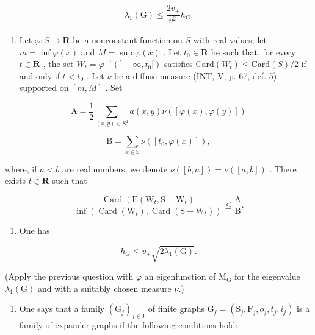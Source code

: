 \[
\lambda_ {1} (\mathrm{G}) \leqslant \frac {2 v _ {+}}{v _ {-} ^ {2}} h _ {\mathrm{G}}.
\]

\begin{enumerate}
\def\labelenumi{\alph{enumi})}
\setcounter{enumi}{2}
\tightlist
\item
  Let \(\varphi\colon S\to\mathbf{R}\) be a nonconstant function on \(S\) with real values; let \(m=\inf\varphi(x)\) and \(M=\sup\varphi(x)\) . Let \(t_{0}\in\mathbf{R}\) be such that, for every \(t\in\mathbf{R}\) , the set \(W_{t}=\overline{\varphi}^{-1}(]-\infty,t_{0}[)\) satisfies \(\mathrm{Card}(W_{t})\leqslant\mathrm{Card}(S)/2\) if and only if \(t<t_{0}\) . Let \(\nu\) be a diffuse measure (INT, V, p. 67, def. 5) supported on \([m,M]\) . Set
\end{enumerate}

\[
\mathrm{A} = \frac {1}{2} \sum_ {(x, y) \in \mathrm{S} ^ {2}} a (x, y) \nu ([ \varphi (x), \varphi (y) ])
\]

\[
\mathrm{B} = \sum_ {x \in \mathrm{S}} \nu ([ t _ {0}, \varphi (x) ]),
\]

where, if \(a < b\) are real numbers, we denote \(\nu([b, a]) = \nu([a, b])\) . There exists \(t \in \mathbf{R}\) such that

\[
\frac {\operatorname{Card} \left(\mathrm{E} \left(\mathrm{W} _ {t} , \mathrm{S} - \mathrm{W} _ {t}\right) \right.}{\inf \left(\operatorname{Card} \left(\mathrm{W} _ {t}\right) , \operatorname{Card} \left(\mathrm{S} - \mathrm{W} _ {t}\right)\right)} \leqslant \frac {\mathrm{A}}{\mathrm{B}}.
\]

\begin{enumerate}
\def\labelenumi{\alph{enumi})}
\setcounter{enumi}{3}
\tightlist
\item
  One has
\end{enumerate}

\[
h _ {\mathrm{G}} \leqslant v _ {+} \sqrt {2 \lambda_ {1} (\mathrm{G})}.
\]

(Apply the previous question with \(\varphi\) an eigenfunction of \(\mathrm{M_G}\) for the eigenvalue \(\lambda_1(\mathrm{G})\) and with a suitably chosen measure \(\nu\).)

\begin{enumerate}
\def\labelenumi{\alph{enumi})}
\setcounter{enumi}{4}
\tightlist
\item
  One says that a family \((\mathrm{G}_{j})_{j\in\mathrm{J}}\) of finite graphs \(\mathrm{G}_{j}=(\mathrm{S}_{j},\mathrm{F}_{j},o_{j},t_{j},i_{j})\) is a family of expander graphs if the following conditions hold:
\end{enumerate}


